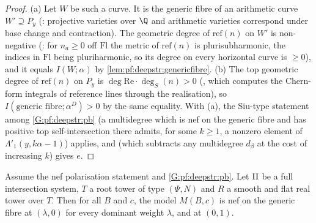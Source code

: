 \begin{proof}
(a) Let $W$ be such a curve. It is the generic fibre of an arithmetic curve $W'\supseteq P_y$
(: projective varieties over $\Q$ and
arithmetic varieties correspond under base change and contraction). The geometric degree of $\mathrm{ref}(n)$
on $W'$ is non-negative (: for $n_a\ge0$ off
$\mathrm{Fl}$ the metric of $\mathrm{ref}(n)$ is plurisubharmonic, the indices in $\mathrm{Fl}$ being pluriharmonic, so its
degree on every horizontal curve is $\ge0$), and it equals $I(W;\alpha)$ by
\cref{lem:pf:deepstr:genericfibre}.
(b) The top geometric degree of $\mathrm{ref}(n)$ on $P_y$ is $\deg\mathrm{Re}\cdot\deg_S(n)>0$
(, which computes the Chern-form
integrals of reference lines through the realisation), so $I(\text{generic fibre};\alpha^D)>0$ by the same
equality. With (a), the Siu-type statement among \ref{G:pf:deepstr:pb} (a multidegree which is nef on the
generic fibre and has positive top self-intersection there admits, for some $k\ge1$, a nonzero element of
$\Lambda'_1(y,k\alpha-1)$) applies, and  (which
subtracts any multidegree $d_\beta$ at the cost of increasing $k$) gives $e$.
\end{proof}

\begin{theorem}\label{thm:pf:deepstr:realnef}
Assume the nef polarisation statement and \ref{G:pf:deepstr:pb}. Let $\mathrm{II}$ be a full intersection system, $T$
a root tower of type $(\Psi,N)$ and $R$ a smooth and flat real tower over $T$. Then for all $B$ and $c$, the model
$M(B,c)$ is nef on the generic fibre at $(\lambda,0)$ for every dominant weight $\lambda$, and at $(0,1)$.
\end{theorem}

